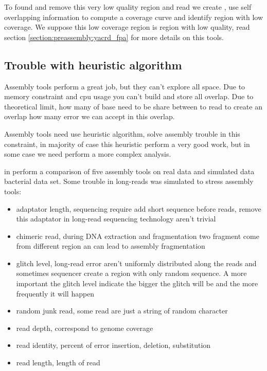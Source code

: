 \documentclass[./main.tex]{subfiles}
\begin{document}
To found and remove this very low quality region and read we create \yacrd, \yacrd use self overlapping information to compute a coverage curve and identify region with low coverage. We suppose this low coverage region is region with low quality, read section \ref{section:preassembly:yacrd_fpa} for more details on this tools.

\subsection{Trouble with heuristic algorithm}

Assembly tools perform a great job, but they can't explore all space.
Due to memory constraint and cpu usage you can't build and store all overlap.
Due to theoretical limit, how many of base need to be share between to read to create an overlap how many error we can accept in this overlap.

Assembly tools need use heuristic algorithm, solve assembly trouble in this constraint, in majority of case this heuristic perform a very good work, but in some case we need perform a more complex analysis.

\citeauthor{long_read_assembler_comparison} in \cite{long_read_assembler_comparison} perform a comparison of five assembly tools on real data and simulated data bacterial data set. Some trouble in long-reads was simulated to stress assembly tools:
\begin{itemize}
    \item adaptator length, sequencing require add short sequence before reads, remove this adaptator in long-read sequencing technology aren't trivial
    \item chimeric read, during DNA extraction and fragmentation two fragment come from different region an can lead to assembly fragmentation
    \item glitch level, long-read error aren't uniformly distributed along the reads and sometimes sequencer create a region with only random sequence. A more important the glitch level indicate the bigger the glitch will be and the more frequently it will happen
    \item random junk read, some read are just a string of random character
    \item read depth, correspond to genome coverage
    \item read identity, percent of error insertion, deletion, substitution 
    \item read length, length of read 
\end{itemize}
\end{document}
